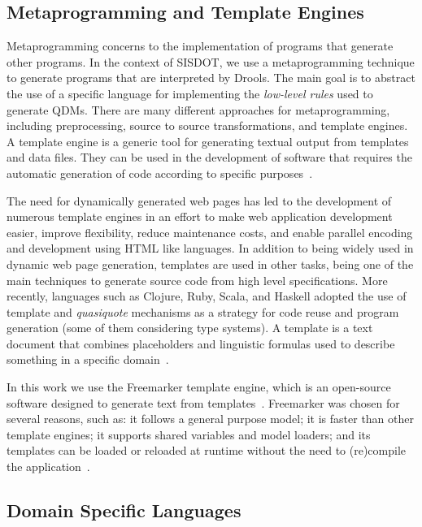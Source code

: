 \subsection{Metaprogramming and Template Engines}

Metaprogramming concerns to the implementation of programs that 
generate other programs. In the context of SISDOT, we use a metaprogramming 
technique to generate programs that are interpreted by Drools. The main goal 
is to abstract the use of a specific language for implementing the 
\emph{low-level rules} used to generate QDMs. There are many different 
approaches for metaprogramming, including preprocessing, source to source 
transformations, and template engines. 
A template engine is a generic tool for generating textual output from templates and data 
files. They can be used 
in the development of software that requires the automatic generation of code 
according to specific purposes~\cite{benato2017}. 

The need for dynamically generated web pages has led to the development of numerous template engines 
in an effort to make web application development easier, improve flexibility, 
reduce maintenance costs, and enable parallel encoding and development using HTML like languages. 
In addition to being widely used in dynamic web page generation, templates are used in other tasks, 
being one of the main techniques to generate source code from high level specifications. More 
recently, languages such as Clojure, Ruby, Scala, and Haskell adopted the use of template and \emph{quasiquote} 
mechanisms as a strategy for code reuse and program generation (some of them considering type systems).
A template is a text document that 
combines placeholders and linguistic formulas used to describe something in a specific domain~\cite{segura2017}. 

In this work we use the Freemarker template engine, which is an open-source software designed to 
generate text from templates~\cite{radjenovic2009}. Freemarker was chosen for several reasons, 
such as: it follows a general purpose model; it is faster than other template engines; it supports 
shared variables and model loaders; and its templates can be loaded or reloaded at runtime without the 
need to (re)compile the application~\cite{benato2017,parr2006}.

\subsection{Domain Specific Languages}

